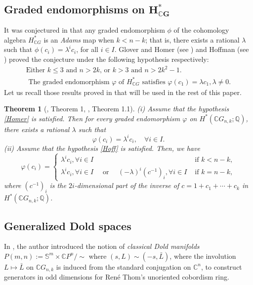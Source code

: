 \documentclass{amsart}
\newtheorem{theorem}{Theorem}[section]
\begin{document}
	\subsection{Graded endomorphisms on $\mathbf{H^*_{\mathbb{C}G}}$}
	It was conjectured in \cite{O} that any graded endomorphism $\phi$ of the cohomology algebra $H^*_{\mathbb{C}G}$ is an\textit{ Adams }map when $k < n - k$; that is, there exists a rational $\lambda$ such that
	$\phi(c_i) = \lambda^i c_i$, for all $ i \in I.$ Glover and Homer (see \cite{glover-homer}) and Hoffman (see \cite{hoffman}) proved the conjecture under the following hypothesis respectively:
	\begin{align}
		\text{Either } k \leq 3 \text{ and } n > 2k \text{, or } k>3 \text{ and } n>2k^2 -1. \label{Homer}\\
		\text{ The graded endomorphism } \varphi  \text{ of } H^*_{\mathbb{C}G} \text{ satisfies } \varphi(c_1) = \lambda c_1, \lambda\neq 0.  \label{Hoff}
	\end{align}
	Let us recall those results proved in \cite{glover-homer, hoffman} that will be used in the rest of this paper.  
	\begin{theorem}[\cite{glover-homer}, Theorem 1, \cite{hoffman}, Theorem 1.1]\label{hom and hof}
		(i) Assume that the hypothesis \eqref{Homer} is satisfied. Then for every graded endomorphism $\varphi$ on $ H^*(\mathbb{C}G_{n,k}; \mathbb{Q})$, there exists a rational $\lambda$ such that
		\[\varphi(c_i) = \lambda^i c_i,  \quad \forall i \in I.\]
		(ii) Assume that the hypothesis \eqref{Hoff} is satisfied. Then, we have
		$$\varphi(c_i) = \begin{cases}
			\lambda^i c_i,   \forall i \in I& \text{ if } k<n-k,\\
			\lambda^i c_i,  \forall i \in I \quad \text{ or } \quad(-\lambda)^i (c^{-1})_i,    \forall i \in I & \text{ if } k= n-k,
		\end{cases}$$
		where $ (c^{-1})_i $ is the $ 2i $-dimensional part of the inverse of $ c = 1 + c_1 + \cdots + c_k $ in $ H^*(\mathbb CG_{n,k}; \mathbb{Q}) $.
	\end{theorem}
	
	\subsection{Generalized Dold spaces}  \label{gen dold}
	In \cite{dold}, the author introduced the notion of \textit{classical Dold manifolds}  
	$P(m,n) := \mathbb{S}^m \times \mathbb{C}P^n / \!\! \sim$  
	where $ (s, L) \sim (-s, \bar{L}) $, where the involution $L\mapsto\bar L$ on $\mathbb CG_{n,k}$ is induced from the standard conjugation on $\mathbb C^n$, to construct generators in odd dimensions for René Thom's unoriented cobordism ring. %
	
\end{document}
